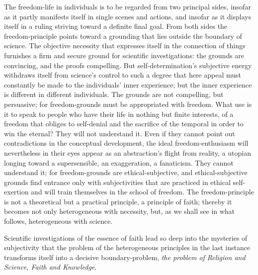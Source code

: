 \documentclass[12pt]{article}
\begin{document}
The freedom-life in individuals is to be regarded from two principal sides,
insofar as it partly manifests itself in single scenes and actions, and
insofar as it displays itself in a ruling striving toward a definite final
goal. From both sides the freedom-principle points toward a grounding that
lies outside the boundary of science. The objective necessity that expresses
itself in the connection of things furnishes a firm and secure ground for
scientific investigations: the grounds are convincing, and the proofs
compelling. But self-determination's subjective energy withdraws itself from
science's control to such a degree that here appeal must constantly be made to
the individuals' inner experience; but the inner experience is different in
different individuals. The grounds are not compelling, but persuasive; for
freedom-grounds must be appropriated with freedom. What use is it
to speak to people who have their life in nothing but finite interests, of a
freedom that obliges to self-denial and the sacrifice of the temporal in
order to win the eternal? They will not understand it. Even if they cannot
point out contradictions in the conceptual development, the ideal
freedom-enthusiasm will nevertheless in their eyes appear as an abstraction's
flight from reality, a utopian longing toward a supersensible, an
exaggeration, a fanaticism. They cannot understand it; for freedom-grounds
are ethical-subjective, and ethical-subjective grounds find entrance only
with subjectivities that are practiced in ethical self-exertion and will train
themselves in the school of freedom. The freedom-principle is not a
theoretical but a practical principle, a principle of faith; thereby it
becomes not only heterogeneous with necessity, but, as we shall see in what
follows, heterogeneous with science.

Scientific investigations of the essence of faith lead so deep into the
mysteries of subjectivity that the problem of the heterogeneous principles in
the last instance transforms itself into a decisive boundary-problem,
\emph{the problem of Religion and Science, Faith and Knowledge}.
\end{document}
